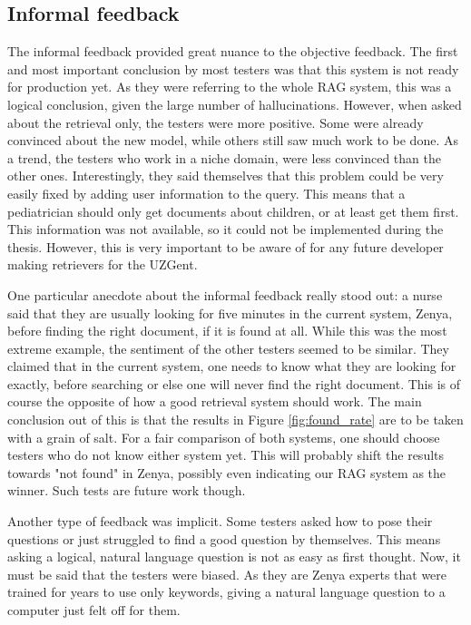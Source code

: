 \subsection{Informal feedback}
The informal feedback provided great nuance to the objective feedback. The first and most important conclusion by most testers was that this system is not ready for production yet. As they were referring to the whole RAG system, this was a logical conclusion, given the large number of hallucinations. However, when asked about the retrieval only, the testers were more positive. Some were already convinced about the new model, while others still saw much work to be done. As a trend, the testers who work in a niche domain, were less convinced than the other ones. Interestingly, they said themselves that this problem could be very easily fixed by adding user information to the query. This means that a pediatrician should only get documents about children, or at least get them first. This information was not available, so it could not be implemented during the thesis. However, this is very important to be aware of for any future developer making retrievers for the UZGent.

One particular anecdote about the informal feedback really stood out: a nurse said that they are usually looking for five minutes in the current system, Zenya, before finding the right document, if it is found at all. While this was the most extreme example, the sentiment of the other testers seemed to be similar. They claimed that in the current system, one needs to know what they are looking for exactly, before searching or else one will never find the right document. This is of course the opposite of how a good retrieval system should work. The main conclusion out of this is that the results in Figure \ref{fig:found_rate} are to be taken with a grain of salt. For a fair comparison of both systems, one should choose testers who do not know either system yet. This will probably shift the results towards "not found" in Zenya, possibly even indicating our RAG system as the winner. Such tests are future work though.

Another type of feedback was implicit. Some testers asked how to pose their questions or just struggled to find a good question by themselves. This means asking a logical, natural language question is not as easy as first thought. Now, it must be said that the testers were biased. As they are Zenya experts that were trained for years to use only keywords, giving a natural language question to a computer just felt off for them.

